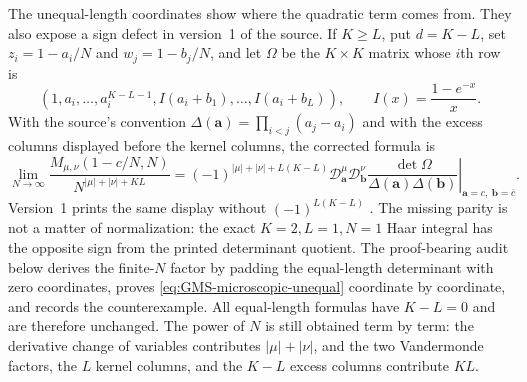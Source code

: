 The unequal-length coordinates show where the quadratic term comes from.  They also expose a
sign defect in version~1 of the source.  If $K\ge L$, put $d=K-L$, set
$z_i=1-a_i/N$ and $w_j=1-b_j/N$, and let $\Omega$ be the $K\times K$ matrix whose $i$th row is
\begin{equation}
 \left(1,a_i,\ldots,a_i^{K-L-1},
 I(a_i+b_1),\ldots,I(a_i+b_L)\right),\qquad
 I(x)=\frac{1-e^{-x}}{x}.
\end{equation}
With the source's convention
$\Delta(\boldsymbol a)=\prod_{i<j}(a_j-a_i)$ and with the excess columns displayed before the
kernel columns, the corrected formula is
\begin{equation}
 \lim_{N\to\infty}
 \frac{M_{\mu,\nu}(1-c/N,N)}{N^{|\mu|+|\nu|+KL}}
 =(-1)^{|\mu|+|\nu|+L(K-L)}
 \left.
 \mathcal D_{\boldsymbol a}^{\mu}\mathcal D_{\boldsymbol b}^{\nu}
 \frac{\det\Omega}{\Delta(\boldsymbol a)\Delta(\boldsymbol b)}
 \right|_{\boldsymbol a=c,\ \boldsymbol b=\overline c}.
 \label{eq:GMS-microscopic-unequal}
\end{equation}
Version~1 prints the same display without $(-1)^{L(K-L)}$
\cite[Sec.~2, theorem labelled \texttt{micro}]{groverMezzadriSimm2026}.  The missing parity is
not a matter of normalization: the exact $K=2,L=1,N=1$ Haar integral has the opposite sign
from the printed determinant quotient.  The proof-bearing audit below derives the finite-$N$
factor by padding the equal-length determinant with zero coordinates, proves
\eqref{eq:GMS-microscopic-unequal} coordinate by coordinate, and records the counterexample.
All equal-length formulas have $K-L=0$ and are therefore unchanged.  The power of $N$ is still
obtained term by term: the derivative change of variables contributes $|\mu|+|\nu|$, and the
two Vandermonde factors, the $L$ kernel columns, and the $K-L$ excess columns contribute $KL$.

